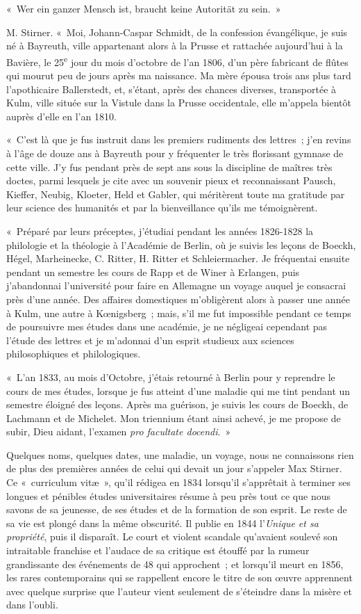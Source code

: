 \documentclass[french,twoside]{book} %
\begin{document}
\noindent « Wer ein ganzer Mensch ist, braucht keine Autorität zu sein. »\par
M. Stirner.
\noindent « Moi, Johann-Caspar Schmidt, de la confession évangélique, je suis né à Bayreuth, ville appartenant alors à la Prusse et rattachée aujourd’hui à la Bavière, le 25\textsuperscript{e} jour du mois d’octobre de l’an 1806, d’un père fabricant de flûtes qui mourut peu de jours après ma naissance. Ma mère épousa trois ans plus tard l’apothicaire Ballerstedt, et, s’étant, après des chances diverses, transportée à Kulm, ville située sur la Vistule dans la Prusse occidentale, elle m’appela bientôt auprès d’elle en l’an 1810.\par
« C’est là que je fus instruit dans les premiers rudiments des lettres ; j’en revins à l’âge de douze ans à Bayreuth pour y fréquenter le très florissant gymnase de cette ville. J’y fus pendant près de sept ans sous la discipline de maîtres très doctes, parmi lesquels je cite avec un souvenir  pieux et reconnaissant Pausch, Kieffer, Neubig, Kloeter, Held et Gabler, qui méritèrent toute ma gratitude par leur science des humanités et par la bienveillance qu’ils me témoignèrent.\par
« Préparé par leurs préceptes, j’étudiai pendant les années 1826-1828 la philologie et la théologie à l’Académie de Berlin, où je suivis les leçons de Boeckh, Hégel, Marheinecke, C. Ritter, H. Ritter et Schleiermacher. Je fréquentai ensuite pendant un semestre les cours de Rapp et de Winer à Erlangen, puis j’abandonnai l’université pour faire en Allemagne un voyage auquel je consacrai près d’une année. Des affaires domestiques m’obligèrent alors à passer une année à Kulm, une autre à Kœnigsberg ; mais, s’il me fut impossible pendant ce temps de poursuivre mes études dans une académie, je ne négligeai cependant pas l’étude des lettres et je m’adonnai d’un esprit studieux aux sciences philosophiques et philologiques.\par
« L’an 1833, au mois d’Octobre, j’étais retourné à Berlin pour y reprendre le cours de mes études, lorsque je fus atteint d’une maladie qui me tint pendant un semestre éloigné des leçons. Après ma guérison, je suivis les cours de Boeckh, de Lachmann et de Michelet. Mon triennium étant ainsi achevé, je me propose de subir, Dieu aidant, l’examen \emph{pro facultate docendi}. »\par
\bigbreak
\noindent Quelques noms, quelques dates, une maladie, un voyage, nous ne connaissons rien de plus des premières années de celui qui devait un jour s’appeler Max Stirner. Ce « curriculum vitæ », qu’il rédigea en 1834 lorsqu’il s’apprêtait à terminer ses longues et pénibles études universitaires résume à peu près tout ce que nous savons de sa jeunesse, de ses études et de la formation de son esprit. Le reste de sa vie est plongé dans la même obscurité. Il publie en 1844 l’\emph{Unique et sa propriété}, puis il disparaît. Le court et violent scandale qu’avaient soulevé son intraitable franchise et l’audace de sa critique est étouffé par la rumeur grandissante des événements de 48 qui approchent ; et lorsqu’il meurt en 1856, les rares contemporains  qui se rappellent encore le titre de son œuvre apprennent avec quelque surprise que l’auteur vient seulement de s’éteindre dans la misère et dans l’oubli.\par
\end{document}
